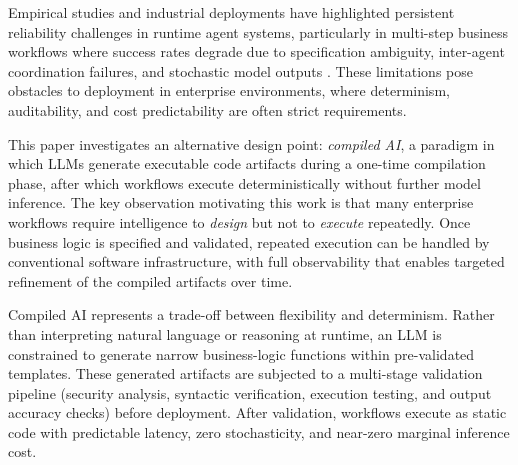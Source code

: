 \documentclass[11pt]{article}
\begin{document}
Empirical studies and industrial deployments have highlighted persistent reliability challenges in runtime agent systems, particularly in multi-step business workflows where success rates degrade due to specification ambiguity, inter-agent coordination failures, and stochastic model outputs \citep{cemri2025multiagent, atil2024nondeterminism}. These limitations pose obstacles to deployment in enterprise environments, where determinism, auditability, and cost predictability are often strict requirements.

This paper investigates an alternative design point: \emph{compiled AI}, a paradigm in which LLMs generate executable code artifacts during a one-time compilation phase, after which workflows execute deterministically without further model inference. The key observation motivating this work is that many enterprise workflows require intelligence to \emph{design} but not to \emph{execute} repeatedly. Once business logic is specified and validated, repeated execution can be handled by conventional software infrastructure, with full observability that enables targeted refinement of the compiled artifacts over time.

Compiled AI represents a trade-off between flexibility and determinism. Rather than interpreting natural language or reasoning at runtime, an LLM is constrained to generate narrow business-logic functions within pre-validated templates. These generated artifacts are subjected to a multi-stage validation pipeline (security analysis, syntactic verification, execution testing, and output accuracy checks) before deployment. After validation, workflows execute as static code with predictable latency, zero stochasticity, and near-zero marginal inference cost.
\end{document}

